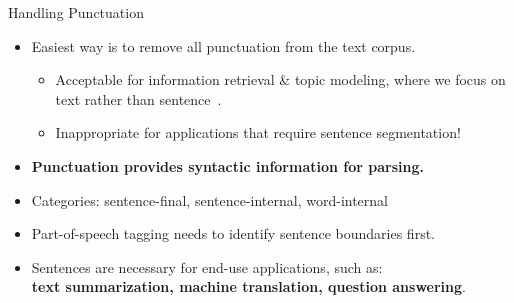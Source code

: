 \documentclass{beamer}
\renewcommand{\cite}{\citep}
\begin{document}
\begin{frame}{Handling Punctuation}
\begin{itemize}
\item Easiest way is to remove all punctuation from the text corpus.
	\begin{itemize}
	\item Acceptable for information retrieval \& topic modeling, where we focus on text rather than sentence~\cite{korde2012text}.
	\item Inappropriate for applications that require sentence segmentation!
	\end{itemize}
	\bigskip
\item \textbf{Punctuation provides syntactic information for parsing.}
\item Categories: sentence-final, sentence-internal, word-internal
\item Part-of-speech tagging needs to identify sentence boundaries first.
\item Sentences are necessary for end-use applications, such as:\\
\textbf{text summarization, machine translation, question answering}.\\
~\cite{patil2015automatic, kim2019researching, li2001incorporating}
\end{itemize}
\end{frame}


\end{document}
